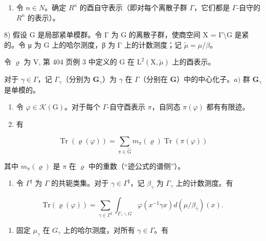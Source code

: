 \begin{enumerate}
\def\labelenumi{\arabic{enumi})}
\setcounter{enumi}{6}
\tightlist
\item
  令 \(n \in N\)。确定 \(R^{n}\) 的酉自守表示（即对每个离散子群 \(\Gamma\)，它们都是 \(\Gamma\)-自守的 \(R^{n}\) 的表示）。
\end{enumerate}

8) 假设 G 是局部紧单模群。令 Γ 为 G 的离散子群，使商空间 X = Γ\textbackslash G 是紧的。令 μ 为 G 上的哈尔测度，β 为 Γ 上的计数测度；记 \(\widetilde{\mu} = \mu/\beta\)。

令 \(\varrho\) 为 V, 第 404 页例 3 中定义的 G 在 \(\mathrm{L}^{2}(\mathrm{X},\widetilde{\mu})\) 上的酉表示。

对于 \(\gamma\in\Gamma\)，记 \(\Gamma_{\gamma}\)（分别为 \(\mathbf{G}_{\gamma}\)）为 \(\gamma\) 在 \(\Gamma\)（分别在 \(\mathbf{G}\)）中的中心化子。\(a)\) 群 \(\mathbf{G}_{\gamma}\) 是单模的。

\begin{enumerate}
\def\labelenumi{\alph{enumi})}
\setcounter{enumi}{1}
\item
  令 \(\varphi\in\mathcal{K}(\mathrm{G})\)。对于每个 \(\Gamma\)-自守酉表示 \(\pi\)，自同态 \(\pi(\varphi)\) 都有有限迹。
\item
  有
\end{enumerate}

\[
\operatorname{Tr} (\varrho (\varphi)) = \sum_ {\pi \in \widehat {\mathrm{G}}} m _ {\pi} (\varrho) \operatorname{Tr} (\pi (\varphi))
\]

其中 \(m_{\pi}(\varrho)\) 是 \(\pi\) 在 \(\varrho\) 中的重数（“迹公式的谱侧”）。

\begin{enumerate}
\def\labelenumi{\alph{enumi})}
\setcounter{enumi}{3}
\tightlist
\item
  令 \(\Gamma^{\sharp}\) 为 \(\Gamma\) 的共轭类集。对于 \(\gamma \in \Gamma^{\sharp}\)，记 \(\beta_{\gamma}\) 为 \(\Gamma_{\gamma}\) 上的计数测度。有
\end{enumerate}

\[
\mathrm{Tr} (\varrho (\varphi)) = \sum_ {\gamma \in \Gamma^ {\sharp}} \int_ {\Gamma_ {\gamma} \backslash G} \varphi (x ^ {- 1} \gamma x) d (\mu / \beta_ {\gamma}) (x).
\]

\begin{enumerate}
\def\labelenumi{\alph{enumi})}
\setcounter{enumi}{4}
\tightlist
\item
  固定 \(\mu_{\gamma}\) 在 \(G_{\gamma}\) 上的哈尔测度，对所有 \(\gamma \in \Gamma\)。有
\end{enumerate}

